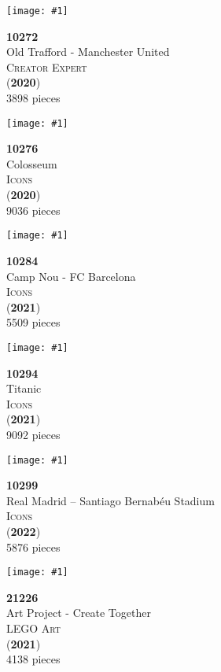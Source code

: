 \documentclass[letterpaper]{article}%
\newenvironment{legocell}[1]
{
	\begin{minipage}[c][2.0in][c]{4in}
	\centering
	\varwidth{3.6in}
	\raggedright %
	\begin{minipage}[c]{1.3in}
		\texttt{[image: \#1]}
	\end{minipage}
	\begin{minipage}[c]{2.2in}
	\raggedright
}
{
	\end{minipage}
	\endvarwidth
	\end{minipage}
	\allowbreak
	\ignorespaces
}
\begin{document}
\begin{legocell}{images/set_10272-1.jpg}
\textbf{10272}\\
{\sffamily\large Old Trafford - Manchester United}\\
\textsc{\color{DarkBlue}\normalsize Creator Expert}\\
(\textbf{2020})\\
{\normalsize 3898 pieces}\\
\end{legocell}
\begin{legocell}{images/set_10276-1.jpg}
\textbf{10276}\\
{\sffamily\large Colosseum}\\
\textsc{\color{DarkBlue}\normalsize Icons}\\
(\textbf{2020})\\
{\normalsize 9036 pieces}\\
\end{legocell}
\begin{legocell}{images/set_10284-1.jpg}
\textbf{10284}\\
{\sffamily\large Camp Nou - FC Barcelona}\\
\textsc{\color{DarkBlue}\normalsize Icons}\\
(\textbf{2021})\\
{\normalsize 5509 pieces}\\
\end{legocell}
\begin{legocell}{images/set_10294-1.jpg}
\textbf{10294}\\
{\sffamily\large Titanic}\\
\textsc{\color{DarkBlue}\normalsize Icons}\\
(\textbf{2021})\\
{\normalsize 9092 pieces}\\
\end{legocell}
\begin{legocell}{images/set_10299-1.jpg}
\textbf{10299}\\
{\sffamily\large Real Madrid – Santiago Bernabéu Stadium}\\
\textsc{\color{DarkBlue}\normalsize Icons}\\
(\textbf{2022})\\
{\normalsize 5876 pieces}\\
\end{legocell}
\begin{legocell}{images/set_21226-1.jpg}
\textbf{21226}\\
{\sffamily\large Art Project - Create Together}\\
\textsc{\color{DarkBlue}\normalsize LEGO Art}\\
(\textbf{2021})\\
{\normalsize 4138 pieces}\\
\end{legocell}
\end{document}
